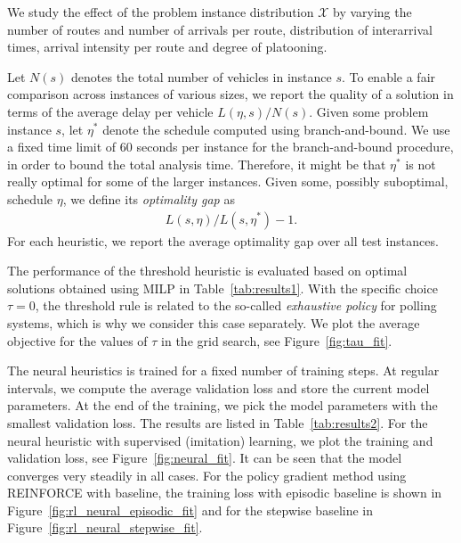\documentclass[a4paper]{report}
\theoremstyle{definition}
\theoremstyle{plain}
\begin{document}
%
We study the effect of the problem instance distribution $\mathcal{X}$ by
varying the number of routes and number of arrivals per route, distribution of
interarrival times, arrival intensity per route and degree of platooning.

Let $N(s)$ denotes the total number of vehicles in instance $s$. To enable a
fair comparison across instances of various sizes, we report the quality of a
solution in terms of the average delay per vehicle $L(\eta, s) / N(s)$.
%
Given some problem instance $s$, let $\eta^{*}$ denote the schedule computed using
branch-and-bound. We use a fixed time limit of 60 seconds per instance for the
branch-and-bound procedure, in order to bound the total analysis time.
Therefore, it might be that $\eta^{*}$ is not really optimal for some of the larger
instances. Given some, possibly suboptimal, schedule $\eta$, we define its \textit{optimality gap}
as
\begin{align*}
  L(s, \eta) / L(s, \eta^{*}) - 1 .
\end{align*}
For each heuristic, we report the average optimality gap over all test
instances.

The performance of the threshold heuristic is evaluated based on optimal
solutions obtained using MILP in Table~\ref{tab:results1}.
%
With the specific choice $\tau = 0$, the threshold rule is related to the
so-called \textit{exhaustive policy} for polling systems, which is why we
consider this case separately. We plot the average objective for the values of
$\tau$ in the grid search, see Figure~\ref{fig:tau_fit}.

The neural heuristics is trained for a fixed number of training steps. At
regular intervals, we compute the average validation loss and store the current
model parameters. At the end of the training, we pick the model parameters with
the smallest validation loss. The results are listed in Table~\ref{tab:results2}.
%
For the neural heuristic with supervised (imitation) learning, we plot the
training and validation loss, see Figure~\ref{fig:neural_fit}. It can be seen that the model
converges very steadily in all cases.
%
For the policy gradient method using REINFORCE with baseline, the training loss
with episodic baseline is shown in Figure~\ref{fig:rl_neural_episodic_fit} and
for the stepwise baseline in Figure~\ref{fig:rl_neural_stepwise_fit}.




\end{document}
